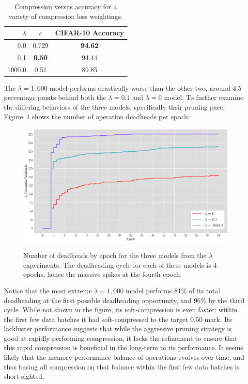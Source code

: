 \begin{table}[h]
\begin{center}
\begin{tabular}{r|c|c}
$\lambda$ & $c$ & CIFAR-10 Accuracy \\
\hline
0.0 & 0.729 & \textbf{94.62} \\
0.1 & \textbf{0.50} & 94.44 \\
1000.0 & 0.51 & 89.85 \\
\end{tabular}
\end{center}
\caption[Compression versus accuracy for a variety of compression loss weightings]{Compression versus accuracy for a variety of compression loss weightings.}
\label{tab:lambda_comparisons}
\end{table}

The $\lambda=1,000$ model performs drastically worse than the other two, around 4.5 percentage points behind
both the $\lambda=0.1$ and $\lambda=0$ model. To further examine the differing behaviors of the three models, specifically
their pruning pace, Figure~\ref{fig:deadheads_per_epoch} shows the number of operation deadheads per epoch:

\begin{figure}[ht]
    \centering
	\includegraphics[width=\textwidth]{lambda_exps/deadheads_per_epochLabeled} \\
	\caption[Number of deadheads by epoch for three BonsaiNet models with different $\lambda$ values]{Number of deadheads by epoch for the three models from the $\lambda$ experiments. The deadheading cycle
	for each of these models is 4 epochs, hence the massive spikes at the fourth epoch.}
	\label{fig:deadheads_per_epoch}
\end{figure}

Notice that the most extreme $\lambda=1,000$ model performs 81\% of its total deadheading at the first possible deadheading
opportunity, and 96\% by the third cycle. While not shown in the figure, its soft-compression is even faster: within the first few data
batches it had soft-compressed to the target 0.50 mark. Its lackluster performance suggests that while the aggressive pruning
strategy is good at rapidly performing compression, it lacks the refinement to ensure that this rapid compression is
beneficial in the long-term to its performance. It seems likely that the memory-performance balance of operations evolves over time,
and thus basing all compression on that balance within the first few data batches is short-sighted.

